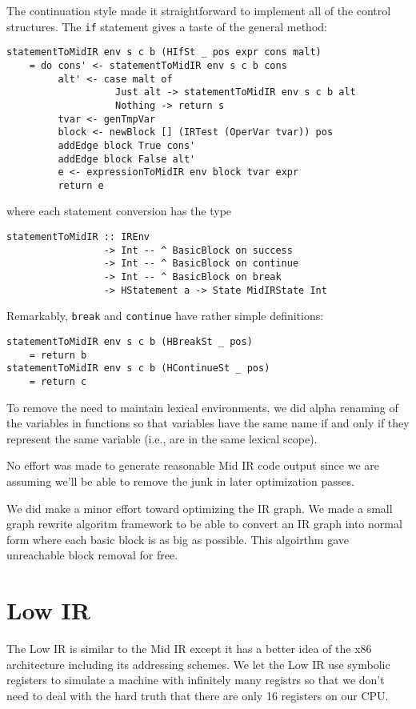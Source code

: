 \documentclass[11pt]{article}
\begin{document}
The continuation style made it straightforward to implement all of the
control structures.  The \texttt{if} statement gives a taste of the general method:
\begin{verbatim}
statementToMidIR env s c b (HIfSt _ pos expr cons malt)
    = do cons' <- statementToMidIR env s c b cons
         alt' <- case malt of
                   Just alt -> statementToMidIR env s c b alt
                   Nothing -> return s
         tvar <- genTmpVar
         block <- newBlock [] (IRTest (OperVar tvar)) pos
         addEdge block True cons'
         addEdge block False alt'
         e <- expressionToMidIR env block tvar expr
         return e
\end{verbatim}
where each statement conversion has the type
\begin{verbatim}
statementToMidIR :: IREnv
                 -> Int -- ^ BasicBlock on success
                 -> Int -- ^ BasicBlock on continue
                 -> Int -- ^ BasicBlock on break
                 -> HStatement a -> State MidIRState Int
\end{verbatim}
Remarkably, \texttt{break} and \texttt{continue} have rather simple
definitions:
\begin{verbatim}
statementToMidIR env s c b (HBreakSt _ pos)
    = return b
statementToMidIR env s c b (HContinueSt _ pos)
    = return c
\end{verbatim}

To remove the need to maintain lexical environments, we did alpha
renaming of the variables in functions so that variables have the same
name if and only if they represent the same variable (i.e., are in the
same lexical scope).

No effort was made to generate reasonable Mid IR code output since we
are assuming we'll be able to remove the junk in later optimization
passes.

We did make a minor effort toward optimizing the IR graph.  We made a
small graph rewrite algoritm framework to be able to convert an IR
graph into normal form where each basic block is as big as possible.
This algoirthm gave unreachable block removal for free.

\section {Low IR} 
\label{sec:lowir}

The Low IR is similar to the Mid IR except it has a better idea of the
x86 architecture including its addressing schemes.  We let the Low IR
use symbolic registers to simulate a machine with infinitely many
registrs so that we don't need to deal with the hard truth that there
are only 16 registers on our CPU.
\end{document}
